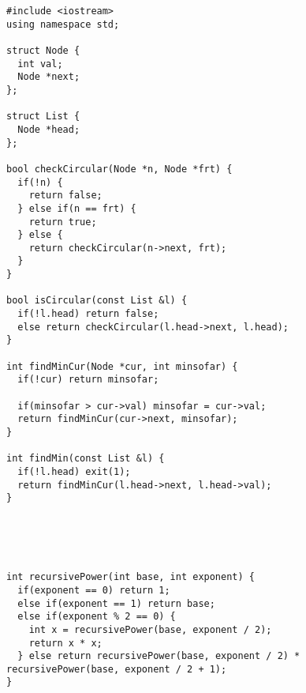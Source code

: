 \documentclass[12pt]{article}
\begin{document}
\begin{verbatim}
#include <iostream>
using namespace std;

struct Node {
  int val;
  Node *next;
};

struct List {
  Node *head;
};

bool checkCircular(Node *n, Node *frt) {
  if(!n) {
    return false;
  } else if(n == frt) {
    return true;
  } else {
    return checkCircular(n->next, frt);
  }
}

bool isCircular(const List &l) {
  if(!l.head) return false;
  else return checkCircular(l.head->next, l.head);
}

int findMinCur(Node *cur, int minsofar) {
  if(!cur) return minsofar;

  if(minsofar > cur->val) minsofar = cur->val;
  return findMinCur(cur->next, minsofar);
}

int findMin(const List &l) {
  if(!l.head) exit(1);
  return findMinCur(l.head->next, l.head->val);
}





int recursivePower(int base, int exponent) {
  if(exponent == 0) return 1;
  else if(exponent == 1) return base;
  else if(exponent % 2 == 0) {
    int x = recursivePower(base, exponent / 2);
    return x * x;
  } else return recursivePower(base, exponent / 2) * recursivePower(base, exponent / 2 + 1);
}
\end{verbatim}
\end{document}
